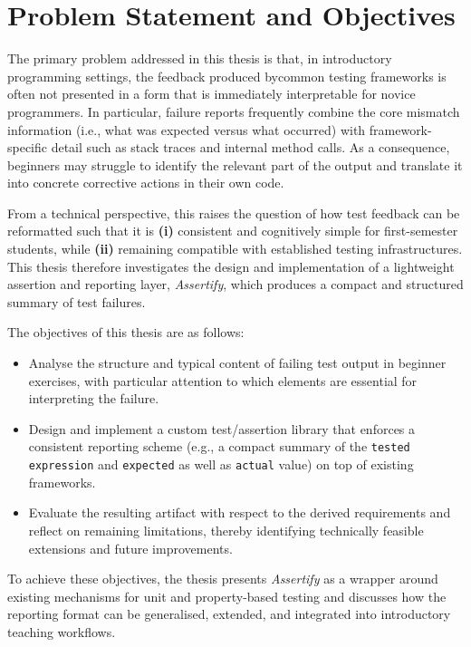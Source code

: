 \section{Problem Statement and Objectives} %
  \label{Problem Statement and Objectives} %


\improve


\begin{justify}
The primary problem addressed in this thesis is that, in introductory programming settings, the
feedback produced bycommon testing frameworks is often not presented in a form that is immediately
interpretable for novice programmers. In particular, failure reports frequently combine the core
mismatch information (i.e., what was expected versus what occurred) with framework-specific detail
such as stack traces and internal method calls. As a consequence, beginners may struggle to identify
the relevant part of the output and translate it into concrete corrective actions in their own code.

\skipM From a technical perspective, this raises the question of how test feedback can be
reformatted such that it is \textbf{(i)} consistent and cognitively simple for first-semester
students, while \textbf{(ii)} remaining compatible with established testing infrastructures. This
thesis therefore investigates the design and implementation of a lightweight assertion and reporting
layer, \emph{Assertify}, which produces a compact and structured summary of test failures.

\skipM The objectives of this thesis are as follows:

\skipS\begin{itemize}[nosep]
    \item Analyse the structure and typical content of failing test output in beginner exercises,
        with particular attention to which elements are essential for interpreting the failure.
    \item Design and implement a custom test/assertion library that enforces a consistent reporting
        scheme (e.g., a compact summary of the \texttt{tested expression} and \texttt{expected} as
        well as \texttt{actual} value) on top of existing frameworks.
    \item Evaluate the resulting artifact with respect to the derived requirements and reflect on
        remaining limitations, thereby identifying technically feasible extensions and future
        improvements.
\end{itemize}

\skipS To achieve these objectives, the thesis presents \emph{Assertify} as a wrapper around
existing mechanisms for unit and property-based testing and discusses how the reporting format can
be generalised, extended, and integrated into introductory teaching workflows.
\end{justify}


